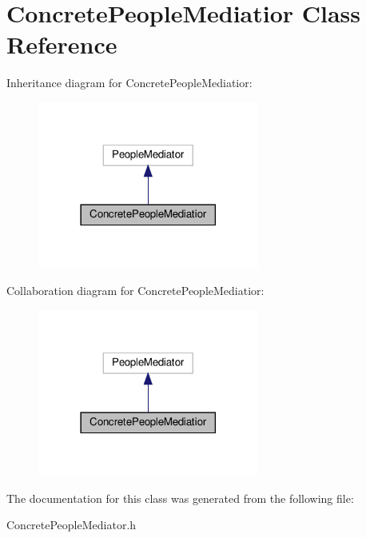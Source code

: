 \hypertarget{classConcretePeopleMediatior}{}\section{Concrete\+People\+Mediatior Class Reference}
\label{classConcretePeopleMediatior}


Inheritance diagram for Concrete\+People\+Mediatior\+:\nopagebreak
\begin{figure}[H]
\begin{center}
\leavevmode
\includegraphics[width=206pt]{classConcretePeopleMediatior__inherit__graph}
\end{center}
\end{figure}


Collaboration diagram for Concrete\+People\+Mediatior\+:\nopagebreak
\begin{figure}[H]
\begin{center}
\leavevmode
\includegraphics[width=206pt]{classConcretePeopleMediatior__coll__graph}
\end{center}
\end{figure}


The documentation for this class was generated from the following file\+:\begin{DoxyCompactItemize}
\item 
Concrete\+People\+Mediator.\+h\end{DoxyCompactItemize}

